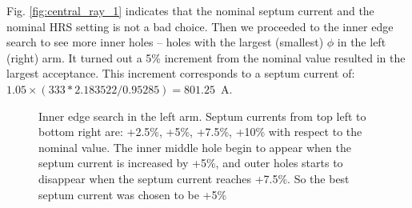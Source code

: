 Fig. \ref{fig:central_ray_1} indicates that the nominal septum current and the 
nominal HRS setting is not a bad choice.
Then we proceeded to the inner edge search to see more inner holes -- holes 
with the largest (smallest) $\phi$ in the left (right) arm.
It turned out a 5\% increment from the nominal value resulted in the largest 
acceptance. This increment corresponds to a septum current of: $1.05 \times (333*2.183522/0.95285) = 801.25$~A.
\begin{figure}[!h]
    \caption[Inner edge search (left arm)]
    {Inner edge search in the left arm. Septum currents from top left
    to bottom right are: +2.5\%, +5\%, +7.5\%, +10\% with respect to the nominal value. 
    The inner middle hole begin to appear when the septum current is increased by +5\%, 
    and outer holes starts to disappear when the septum current reaches +7.5\%. So the best
    septum current was chosen to be +5\%}
\end{figure}

